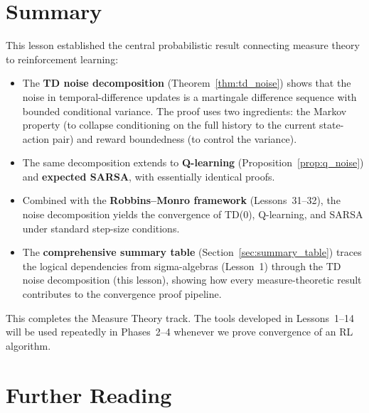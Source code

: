 \documentclass[11pt,a4paper]{article}
\begin{document}

\section{Summary}
\label{sec:summary}

This lesson established the central probabilistic result
connecting measure theory to reinforcement learning:

\begin{itemize}[nosep]
  \item The \textbf{TD noise decomposition}
    (Theorem~\ref{thm:td_noise}) shows that the noise in
    temporal-difference updates is a martingale difference
    sequence with bounded conditional variance.  The proof
    uses two ingredients: the Markov property (to collapse
    conditioning on the full history to the current
    state-action pair) and reward boundedness (to control
    the variance).

  \item The same decomposition extends to \textbf{Q-learning}
    (Proposition~\ref{prop:q_noise}) and \textbf{expected
    SARSA}, with essentially identical proofs.

  \item Combined with the \textbf{Robbins--Monro framework}
    (Lessons~31--32), the noise decomposition yields the
    convergence of TD(0), Q-learning, and SARSA under
    standard step-size conditions.

  \item The \textbf{comprehensive summary table}
    (Section~\ref{sec:summary_table}) traces the logical
    dependencies from sigma-algebras (Lesson~1) through
    the TD noise decomposition (this lesson), showing how
    every measure-theoretic result contributes to the
    convergence proof pipeline.
\end{itemize}

This completes the Measure Theory track.  The tools
developed in Lessons~1--14 will be used repeatedly in
Phases~2--4 whenever we prove convergence of an RL algorithm.


\section{Further Reading}
\label{sec:further_reading}
\end{document}
